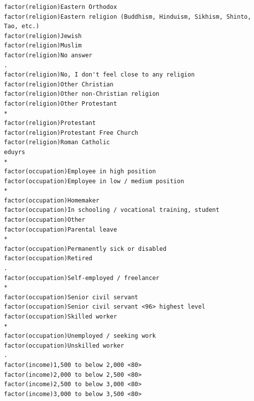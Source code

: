 \documentclass[
]{article}
\begin{document}
\begin{table}
\begin{minipage}[t]{\linewidth}
{\begin{verbatim}
factor(religion)Eastern Orthodox                                                     
factor(religion)Eastern religion (Buddhism, Hinduism, Sikhism, Shinto, Tao, etc.)    
factor(religion)Jewish                                                               
factor(religion)Muslim                                                               
factor(religion)No answer                                                         .  
factor(religion)No, I don't feel close to any religion                               
factor(religion)Other Christian                                                      
factor(religion)Other non-Christian religion                                         
factor(religion)Other Protestant                                                  *  
factor(religion)Protestant                                                           
factor(religion)Protestant Free Church                                               
factor(religion)Roman Catholic                                                       
eduyrs                                                                            *  
factor(occupation)Employee in high position                                          
factor(occupation)Employee in low / medium position                               *  
factor(occupation)Homemaker                                                          
factor(occupation)In schooling / vocational training, student                        
factor(occupation)Other                                                              
factor(occupation)Parental leave                                                  *  
factor(occupation)Permanently sick or disabled                                       
factor(occupation)Retired                                                         .  
factor(occupation)Self-employed / freelancer                                      *  
factor(occupation)Senior civil servant                                               
factor(occupation)Senior civil servant <96> highest level                            
factor(occupation)Skilled worker                                                  *  
factor(occupation)Unemployed / seeking work                                          
factor(occupation)Unskilled worker                                                .  
factor(income)1,500 to below 2,000 <80>                                              
factor(income)2,000 to below 2,500 <80>                                              
factor(income)2,500 to below 3,000 <80>                                              
factor(income)3,000 to below 3,500 <80>                                              

\end{verbatim}}
\end{minipage}
\end{table}
\end{document}
